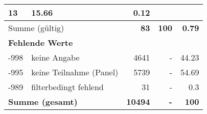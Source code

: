 \begin{longtable}{lXrrr}
       \num{13} &
       \num[round-mode=places,round-precision=2]{15,66} &
         \num[round-mode=places,round-precision=2]{0,12} \\
     \midrule
     \multicolumn{2}{l}{Summe (gültig)} &
       \textbf{\num{83}} &
     \textbf{100} &
       \textbf{\num[round-mode=places,round-precision=2]{0,79}} \\
     \multicolumn{5}{l}{\textbf{Fehlende Werte}}\\
       -998 &
       keine Angabe &
         \num{4641} &
        - &
         \num[round-mode=places,round-precision=2]{44,23} \\
       -995 &
       keine Teilnahme (Panel) &
         \num{5739} &
        - &
         \num[round-mode=places,round-precision=2]{54,69} \\
       -989 &
       filterbedingt fehlend &
         \num{31} &
        - &
         \num[round-mode=places,round-precision=2]{0,3} \\
     \midrule
     \multicolumn{2}{l}{\textbf{Summe (gesamt)}} &
          \textbf{\num{10494}} &
        \textbf{-} &
        \textbf{100} \\
     \bottomrule
     \end{longtable}
     
